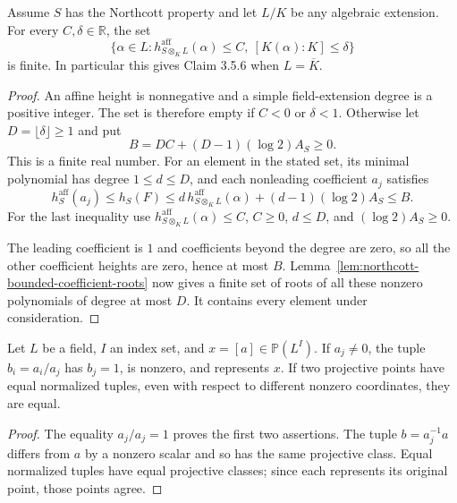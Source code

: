 \begin{lemma}
\label{lem:northcott-algebraic-elements}
\leanok
Assume $S$ has the Northcott property and let $L/K$ be any algebraic
extension. For every $C,\delta\in\mathbb R$,
the set
\[
 \{\alpha\in L:
       h_{S\otimes_K L}^{\mathrm{aff}}(\alpha)\leq C,\ [K(\alpha):K]\leq\delta\}
\]
is finite. In particular this gives Claim 3.5.6 when $L=\overline K$.
\end{lemma}
\begin{proof}
An affine height is nonnegative and a simple field-extension degree
is a positive integer. The set is therefore empty if $C<0$ or
$\delta<1$. Otherwise let $D=\lfloor\delta\rfloor\geq1$ and put
\[
 B=DC+(D-1)(\log2)A_S\geq0.
\]
This is a finite real number. For an element in the stated set, its
minimal polynomial has degree $1\leq d\leq D$, and each nonleading
coefficient $a_j$ satisfies
\[
 h_S^{\mathrm{aff}}(a_j)\leq h_S(F)
 \leq d\,h_{S\otimes_K L}^{\mathrm{aff}}(\alpha)+(d-1)(\log2)A_S\leq B.
\]
For the last inequality use $h_{S\otimes_K L}^{\mathrm{aff}}(\alpha)\leq C$,
$C\geq0$, $d\leq D$, and $(\log2)A_S\geq0$.

The leading coefficient is $1$ and coefficients beyond the degree
are zero, so all the other coefficient heights are zero, hence at
most $B$. Lemma~\ref{lem:northcott-bounded-coefficient-roots}
now gives a finite set of roots of all these nonzero polynomials
of degree at most $D$. It contains every element under consideration.
\end{proof}

\begin{lemma}
\label{lem:projective-normalized-representatives}
\leanok
Let $L$ be a field, $I$ an index set, and $x=[a]\in\mathbb P(L^I)$.
If $a_j\ne0$, the tuple $b_i=a_i/a_j$ has $b_j=1$, is nonzero,
and represents $x$. If two projective points have equal normalized
tuples, even with respect to different nonzero coordinates, they are equal.
\end{lemma}
\begin{proof}
The equality $a_j/a_j=1$ proves the first two assertions. The tuple
$b=a_j^{-1}a$ differs from $a$ by a nonzero scalar and so has the
same projective class. Equal normalized tuples have equal projective
classes; since each represents its original point, those points agree.
\end{proof}

